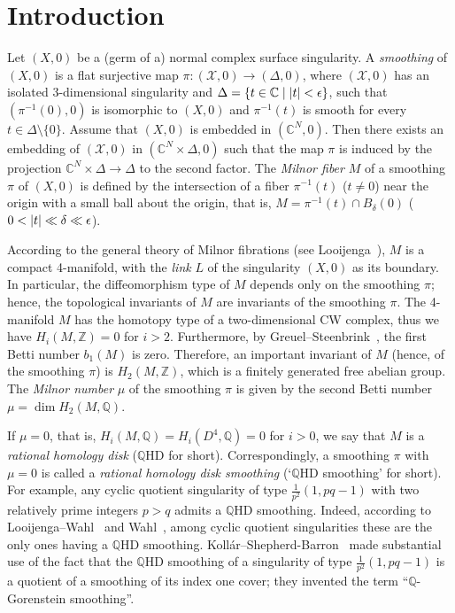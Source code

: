 \documentclass[a4paper, reqno, twoside]{amsart}
\theoremstyle{definition}
\numberwithin{equation}{section}
\begin{document}
\section{Introduction}
\label{sec:intro}
Let $(X, 0)$ be a (germ of a) normal complex surface singularity. A \emph{smoothing} of $(X, 0)$ is a flat surjective map $\pi\colon (\mathcal{X}, 0) \to (\Delta, 0)$, where $(\mathcal{X}, 0)$ has an
isolated 3-dimensional singularity and $\Delta = \{t \in \mathbb{C}
\mid {\ensuremath \left\lvert {t} \right\rvert} < \epsilon \}$, such that $(\pi^{-1}(0), 0)$ is
isomorphic to $(X, 0)$ and $\pi^{-1}(t)$ is smooth for every $t \in
\Delta \setminus \{0\}$. Assume that $(X,0)$ is embedded in $(\mathbb{C}^N,
0)$. Then there exists an embedding of $(\mathcal{X}, 0)$ in
$(\mathbb{C}^N \times \Delta, 0)$ such that the map $\pi$ is induced
by the projection $\mathbb{C}^N \times \Delta \to \Delta$ to the
second factor. The \emph{Milnor fiber} $M$ of a smoothing $\pi$ of
$(X,0)$ is defined by the intersection of a fiber $\pi^{-1}(t)$ ($t
\neq 0$) near the origin with a small ball about the origin, that
is, $M = \pi^{-1}(t) \cap B_{\delta}(0)$ ($0 < {\ensuremath \left\lvert {t} \right\rvert} \ll \delta \ll
\epsilon$).

According to the general theory of Milnor fibrations (see
Looijenga~\cite{Looijenga-1984}), $M$ is a compact 4-manifold, with the
\emph{link} $L$ of the singularity $(X,0)$ as its boundary. In particular, the
diffeomorphism type of $M$ depends only on the smoothing $\pi$; hence, the
topological invariants of $M$ are invariants of the smoothing $\pi$.  The
4-manifold $M$ has the homotopy type of a two-dimensional CW complex, thus we
have $H_i(M, \mathbb{Z})=0$ for $i > 2$. Furthermore, by
Greuel--Steenbrink~\cite[Theorem~2]{Greuel-Steenbrink-1983}, the first Betti
number $b_1(M)$ is zero. Therefore, an important invariant of $M$ (hence, of
the smoothing $\pi$) is $H_2(M, \mathbb{Z})$, which is a finitely generated
free abelian group. The \emph{Milnor number} $\mu$ of the smoothing $\pi$ is
given by the second Betti number $\mu=\dim {H_2(M, \mathbb{Q})}$.

If $\mu=0$, that is, $H_i(M, \mathbb{Q})=H_i(D^4,\mathbb{Q})=0$ for
$i>0$, we say that $M$ is a \emph{rational homology disk} ({$\mathbb{Q}$HD\xspace} for
short).  Correspondingly, a smoothing $\pi$ with $\mu=0$ is called a
\emph{rational homology disk smoothing} (`{$\mathbb{Q}$HD smoothing\xspace}' for short). For
example, any cyclic quotient singularity of type $\frac{1}{p^2}(1,
pq-1)$ with two relatively prime integers $p>q$ admits a
{$\mathbb{Q}$HD smoothing\xspace}. Indeed, according to
Looijenga--Wahl~\cite[(5.10)]{Looijenga-Wahl-1986} and
Wahl~\cite[(5.9.1)]{Wahl-1981}, among cyclic quotient singularities
these are the only ones having a
{$\mathbb{Q}$HD smoothing\xspace}. Koll\'ar--Shepherd-Barron~\cite{Kollar-Shepherd-Barron-1988}
made substantial use of the fact that the {$\mathbb{Q}$HD smoothing\xspace} of a singularity of
type $\frac{1}{p^2}(1, pq-1)$ is a quotient of a smoothing of its
index one cover; they invented the term ``$\mathbb{Q}$-Gorenstein
smoothing''.
\end{document}
